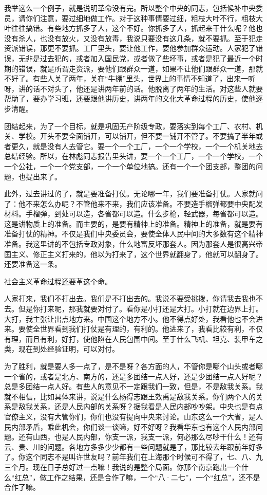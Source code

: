 我举这么一个例子，就是说明革命没有完。所以整个中央的同志，包括候补中央委员，请你们注意，要过细地做工作。对于这种事情要过细，粗枝大叶不行，粗枝大叶往往搞错。有些地方抓多了人，这个不好。你抓多了人，抓起来干什么呢？他也没有杀人，也没有放火，又没有放毒，我说只要没有这几条，就不要抓。至于犯走资派错误，那更不要抓。工厂里头，要让他工作，要他参加群众运动。人家犯了错误，无非是过去犯的，或者加入国民党，或者做了些坏事，或者是犯了最近一个时期的错误，就是所谓走资派，要他们跟群众一道，如果不让他们跟群众一道，那就不好了。有些人关了两年，关在“牛棚”里头，世界上的事情不知道了，出来一听呀，讲的话不对头了，他还是讲两年前的话。他脱离了两年的生活。对这些人就要帮助了，要办学习班，还要跟他讲历史，讲两年的文化大革命过程的历史，使他逐步清醒。

团结起来，为了一个目标，就是巩固无产阶级专政，要落实到每个工厂、农村、机关、学校。开头不要全面铺开，可以铺开，但不要一铺开不管了。不要搞了半年或者更久，就是没有人去管它。要一个一个工厂，一个一个学校，一个一个机关地去总结经验。所以，在林彪同志报告里头讲，要一个一个工厂，一个一个学校，一个一个公社，一个一个党支部，一个一个单位地搞。还有一个一个团支部，整团的问题，也提出来了。

此外，过去讲过的了，就是要准备打仗。无论哪一年，我们要准备打仗。人家就问了：他不来怎么办呢？不管他来不来，我们应该准备。不要造手榴弹都要中央配发材料。手榴弹，到处可以造，各省都可以造。什么步枪，轻武器，每省都可以造。这是讲物质上的准备。而主要的，是要有精神上的准备。精神上的准备，就是要有准备打仗的精神。不仅是我们中央委员会，要使全体人民中间的大多数有这个精神准备。我这里讲的不包括专政对象，什么地富反坏那套人。因为那套人是很高兴帝国主义、修正主义打来的，他以为打来了，这个世界就翻身了，他就可以翻身了。还要准备这一条。

社会主义革命过程还要革这个命。

人家打来，我们不打出去。我们是不打出去的。我说不要受挑拨，你请我去我也不去。但是你打来呢，那我就要对付了。看你是小打还是大打。小打就在边界上打。大打，我主张让出点地方来。中国这个地方不小。他不得点好处，我看他也不会进来。要使全世界看到我们打仗是有理的，有利的。他进来了，我看比较有利，不仅有理，而且有利，好打，使他陷在人民包围中间。至于什么飞机、坦克、装甲车之类，现在到处经验证明，可以对付。

为了胜利，就是要人多一点了，是不是呀？各方面的人，不管你是哪个山头或者哪一个省的，或者是北方、南方的，还是多团结一点人好，还是少团结一点人好呢？总是多团结一点人好。有些人的意见不一定跟我们一致，但是，不是敌我关系。我就不相信，比如具体来讲，说是什么杨得志跟王效禹是敌我关系。你们两个人的关系是敌我关系，还是人民内部的关系呀？据我看是人民内部吵吵架。中央也是有点官僚主义，没有大管你们，你们也没有提向中央来讨论。山东这么一个大省，是人民内部矛盾，乘此机会，你们谈一谈嘛，好不好呀？我看华东也有这个人民内部问题。还有山西，也是人民内部，你支一派，我支一派，何必那么尽吵干什么！还有云、贵、川的问题。各地方多多少少都有一些问题就是了，那比较去年跟前年好多了。你这个同志不是叫许世友吗？前年我们在上海那个时候可不得了，七、八、九三个月。现在日子总好过一点嘛！我说的是整个局面。你那个南京跑出一个什么“红总”，做工作之结果，还是合作了嘛，一个“八·二七”，一个“红总”，还不是合作了嘛。

